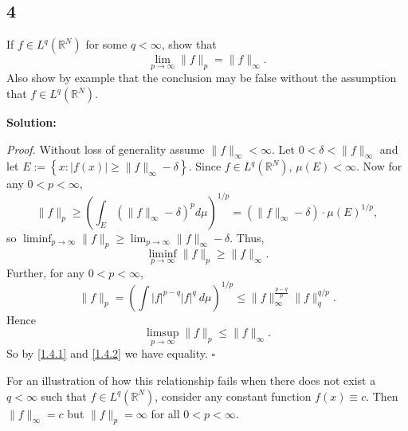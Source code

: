 \documentclass[12pt]{article}
\newcounter{ProofCounter}
\newenvironment{Proof}{\stepcounter{ProofCounter}\textit{Proof.}}{\hfill$\square$}
\begin{document}
\newpage
\subsection*{4}
If $f \in L^{q}(\mathbb{R}^{N})$ for some $q < \infty$, show that 
\[ \lim_{p\rightarrow\infty} \|f\|_{p} = \|f\|_{\infty}. \]
Also show by example that the conclusion may be false without the assumption that $f \in L^{q}(\mathbb{R}^{N})$.

{\bf Solution:}

\begin{Proof}
Without loss of generality assume $\|f\|_{\infty} < \infty$. Let $0 < \delta < \|f\|_{\infty}$ and let $E := \left\{ x : |f(x)| \geq \|f\|_{\infty} - \delta \right\}$. 
Since $f \in L^{q}(\mathbb{R}^{N})$, $\mu(E) < \infty$. Now for any $0 < p < \infty$,
\[ \|f\|_{p} \geq \left( \int_{E}(\|f\|_{\infty} - \delta)^{p} d\mu\right)^{1/p} = (\|f\|_{\infty} - \delta)\cdot \mu(E)^{1/p}, \]
so $\liminf_{p \rightarrow \infty}\|f\|_{p} \geq \lim_{p\rightarrow\infty}\|f\|_{\infty} - \delta$. Thus,
\begin{equation}
\liminf_{p \rightarrow \infty} \|f\|_{p} \geq \|f\|_{\infty}.
\label{1.4.1}
\end{equation}
Further, for any $0 < p < \infty$,
\[ \|f\|_{p} = \left( \int |f|^{p-q}|f|^{q}\ d\mu \right)^{1/p} \leq \|f\|_{\infty}^{\frac{p-q}{p}}\|f\|_{q}^{q/p}. \]
Hence 
\begin{equation}
\limsup_{p\rightarrow\infty}\|f\|_{p} \leq \|f\|_{\infty}.
\label{1.4.2}
\end{equation}
So by \eqref{1.4.1} and \eqref{1.4.2} we have equality.
\end{Proof}

For an illustration of how this relationship fails when there does not exist a $q < \infty$ such that $f \in L^{q}(\mathbb{R}^{N})$, consider any
constant function $f(x) \equiv c$. Then $\|f\|_{\infty} = c$ but $\|f\|_{p} = \infty$ for all $0 < p < \infty$.
\end{document}
